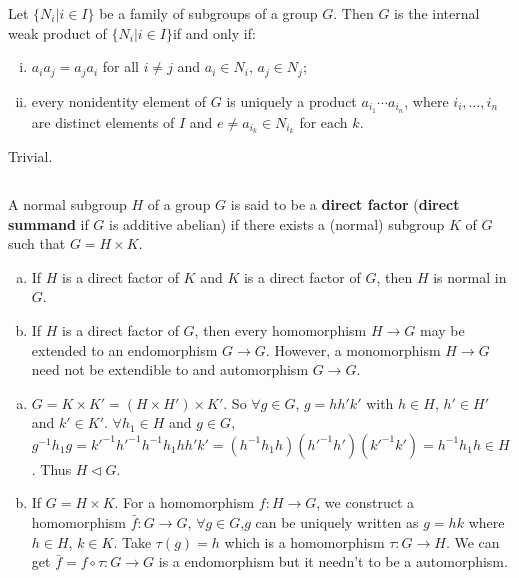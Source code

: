 $$ $$

\begin{ex}
    Let $\{N_{i}|i\in I\}$ be a family of subgroups of a group $G$. Then $G$ is the internal weak product of $\{N_{i}|i\in I\}$if and only if:
    \begin{enumerate}[(i)]
        \item $a_{i}a_{j}=a_{j}a_{i}$ for all $i\neq j$ and $a_{i}\in N_{i}$, $a_{j}\in N_{j}$;
        \item every nonidentity element of $G$ is uniquely a product $a_{i_{1}}\cdots a_{i_{n}}$, where $i_{i},\dots,i_{n}$ are distinct elements of $I$ and $e\neq a_{i_{k}}\in N_{i_{k}}$ for each $k$.
    \end{enumerate}
\end{ex}

\begin{answer}
    Trivial.
\end{answer}

$$ $$

\begin{ex}
    A normal subgroup $H$ of a group $G$ is said to be a \textbf{direct factor} (\textbf{direct summand} if $G$ is additive abelian) if there exists a (normal) subgroup $K$ of $G$ such that $G=H\times K$.
    \begin{enumerate}[(a)]
        \item If $H$ is a direct factor of $K$ and $K$ is a direct factor of $G$, then $H$ is normal in $G$.
        \item If $H$ is a direct factor of $G$, then every homomorphism $H\to G$ may be extended to an endomorphism $G\to G$. However, a monomorphism $H\to G$ need not be extendible to and automorphism $G\to G$.
    \end{enumerate}
\end{ex}

\begin{answer}
    \begin{enumerate}[(a)]
        \item $G=K\times K'= (H\times H')\times K'$. So $\forall g\in G$, $g=hh'k'$ with $h\in H$, $h' \in H'$ and $k'\in K'$. $\forall h_{1}\in H$ and $g\in G$, $g^{-1}h_{1}g=k'^{-1}h'^{-1}h^{-1}h_{1}hh'k'=(h^{-1}h_{1}h)(h'^{-1}h')(k'^{-1}k')=h^{-1}h_{1}h\in H$. Thus $H\lhd G$.
        \item If $G=H\times K$. For a homomorphism $f:H\to G$, we construct a homomorphism $\bar{f}:G\to G$, $\forall g\in G$,$g$ can be uniquely written as $g=hk$ where $h\in H$, $k\in K$. Take $\tau(g)=h$ which is a homomorphism $\tau:G\to H$. We can get $\bar{f}=f\circ\tau: G\to G$ is a endomorphism but it needn't to be a automorphism.
    \end{enumerate}
\end{answer}

